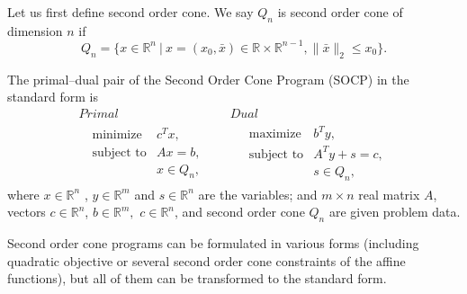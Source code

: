 \documentclass[12pt]{book}
\theoremstyle{definition}
\begin{document}
Let us first define second order cone.
\label{defSOC} We say $Q_n$ is second order cone of dimension $n$ if 
\begin{equation}
Q_n=\{x\in \mathbb{R}^n \ | \ x = (x_0,\bar{x}) \in \mathbb{R}\times\mathbb{R}^{n-1}, \|\bar{x}\|_2\leq x_0\}.
\end{equation}


\label{defSOCP}
The primal--dual pair of the Second Order Cone Program (SOCP) in the standard form is
\begin{equation}
\label{socp} 
\begin{array}{cc}
Primal & Dual \\
\ \ \ \begin{array}{ll}
\mbox{minimize} & c^Tx,\\
\mbox{subject to}& Ax = b,\\
& x \in Q_n,
\end{array} 
 \ \ \ \ \ & \ \ \ \ \ 
 \begin{array}{ll}
\mbox{maximize} & b^Ty,\\
\mbox{subject to}& A^Ty + s = c,\\
& s \in Q_n,
\end{array}
\end{array}
\end{equation}
where $x\in \mathbb{R}^n$ , $y\in \mathbb{R}^m$ and $s\in \mathbb{R}^n$ are the variables; and $m\times n$ real matrix $A$, vectors $c\in \mathbb{R}^n$, $b\in \mathbb{R}^{m},$ $c\in \mathbb{R}^n$, and second order cone $Q_n$ are given problem data.

\rem Second order cone programs can be formulated in various forms (including quadratic objective or several second order cone constraints of the affine functions), but all of them can be transformed to the standard form. 
\end{document}
